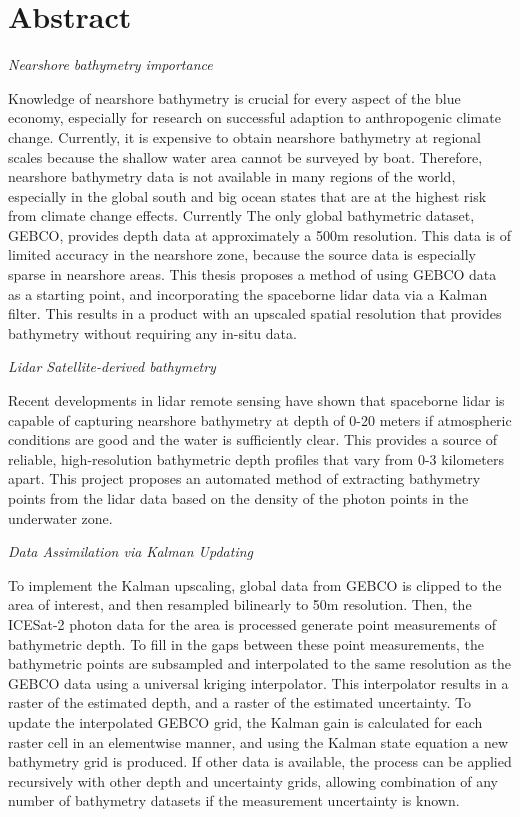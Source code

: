 \chapter*{Abstract}
\emph{Nearshore bathymetry importance}

Knowledge of nearshore bathymetry is crucial for every aspect of the blue economy, especially for research on successful adaption to anthropogenic climate change. Currently, it is expensive to obtain nearshore bathymetry at regional scales because the shallow water area cannot be surveyed by boat. Therefore, nearshore bathymetry data is not available in many regions of the world, especially in the global south and big ocean states that are at the highest risk from climate change effects. Currently The only global bathymetric dataset, GEBCO, provides depth data at approximately a 500m resolution. This data is of limited accuracy in the nearshore zone, because the source data is especially sparse in nearshore areas. This thesis proposes a method of using GEBCO data as a starting point, and incorporating the spaceborne lidar data via a Kalman filter. This results in a product with an upscaled spatial resolution that provides bathymetry without requiring any in-situ data.

\emph{Lidar Satellite-derived bathymetry}

Recent developments in lidar remote sensing have shown that spaceborne lidar is capable of capturing nearshore bathymetry at depth of 0-20 meters if atmospheric conditions are good and the water is sufficiently clear. This provides a source of reliable, high-resolution bathymetric depth profiles that vary from 0-3 kilometers apart. This project proposes an automated method of extracting bathymetry points from the lidar data based on the density of the photon points in the underwater zone.

\emph{Data Assimilation via Kalman Updating}

To implement the Kalman upscaling, global data from GEBCO is clipped to the area of interest, and then resampled bilinearly to 50m resolution. Then, the ICESat-2 photon data for the area is processed generate point measurements of bathymetric depth. To fill in the gaps between these point measurements, the bathymetric points are subsampled and interpolated to the same resolution as the GEBCO data using a universal kriging interpolator. This interpolator results in a raster of the estimated depth, and a raster of the estimated uncertainty. To update the interpolated GEBCO grid, the Kalman gain is calculated for each raster cell in an elementwise manner, and using the Kalman state equation a new bathymetry grid is produced. If other data is available, the process can be applied recursively with other depth and uncertainty grids, allowing combination of any number of bathymetry datasets if the measurement uncertainty is known. 

